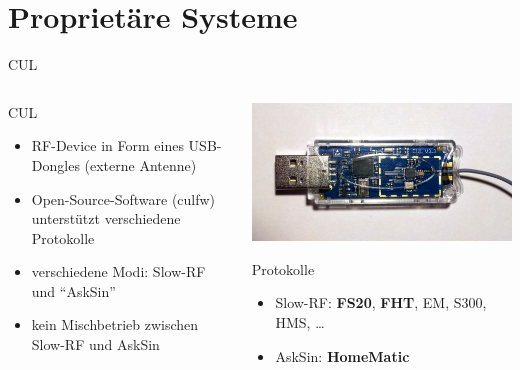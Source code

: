 \section{Proprietäre Systeme}

\begin{frame}{CUL}
	\begin{columns}
		\begin{column}[c]{0.45\textwidth}
			\begin{block}{CUL}
			\begin{itemize}
			\item 	RF-Device in Form eines USB-Dongles \linebreak
					(externe Antenne)
			\item 	Open-Source-Software (culfw) unterstützt verschiedene Protokolle
			\item 	verschiedene Modi: Slow-RF und \enquote{AskSin}
			\item 	\alert{kein Mischbetrieb zwischen Slow-RF und AskSin}
			\end{itemize}
			\end{block}
		\end{column}
		\begin{column}[c]{0.45\textwidth}
			\includegraphics[width=\linewidth]{Cul}
			\begin{block}{Protokolle}
				\begin{itemize}
				\item 	Slow-RF: \linebreak
						\textbf{FS20}, \textbf{FHT}, EM, \linebreak
						S300, HMS, \ldots
				\item 	AskSin: \linebreak
						\textbf{HomeMatic}
				\end{itemize}
			\end{block}
		\end{column}
	\end{columns}
\end{frame}

